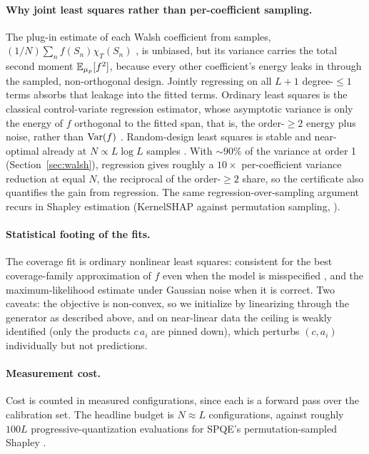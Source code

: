 \paragraph{Why joint least squares rather than per-coefficient sampling.} The plug-in estimate of
each Walsh coefficient from samples, $(1/N)\sum_n f(S_n)\chi_T(S_n)$ \citep{lmn1993}, is unbiased, but its
variance
carries the total second moment $\mathbb{E}_{\mu_p}[f^2]$, because every other coefficient's energy leaks in
through the
sampled, non-orthogonal design. Jointly regressing on all $L+1$ degree-$\le 1$ terms absorbs that
leakage into the fitted terms. Ordinary least squares is the classical control-variate regression
estimator, whose asymptotic variance is
only the energy of $f$ orthogonal to the fitted span, that is, the order-$\ge 2$ energy plus noise, rather
than $\operatorname{Var}(f)$ \citep{lavenberg1981cv,glynn2002cv,owen2013mcbook}. Random-design least squares is
stable and near-optimal already at $N \propto L\log L$ samples \citep{cohen2017optimalwls}. With
${\sim}90\%$ of the variance at order 1 (Section~\ref{sec:walsh}), regression gives roughly a $10\times$
per-coefficient
variance reduction at equal $N$, the reciprocal of the order-$\ge 2$ share, so the certificate also
quantifies the gain from regression. The same
regression-over-sampling argument recurs in Shapley estimation (KernelSHAP against permutation sampling,
\citealp{covert2021kernelshap}).

\paragraph{Statistical footing of the fits.} The coverage fit is ordinary nonlinear least squares:
consistent for the best coverage-family approximation of $f$ even when the model is misspecified
\citep{jennrich1969,white1981}, and the maximum-likelihood estimate under Gaussian noise when it is
correct. Two caveats: the objective is non-convex, so we initialize by linearizing through the
generator as described above, and on near-linear data the ceiling is weakly identified (only the
products $c\,a_i$ are pinned down), which perturbs $(c,a_i)$ individually but not predictions.

\paragraph{Measurement cost.} Cost is counted in measured configurations, since each is a forward pass
over the calibration set. The headline budget is $N\approx L$ configurations, against roughly $100L$
progressive-quantization evaluations for SPQE's permutation-sampled Shapley \citep{impq2025}.

